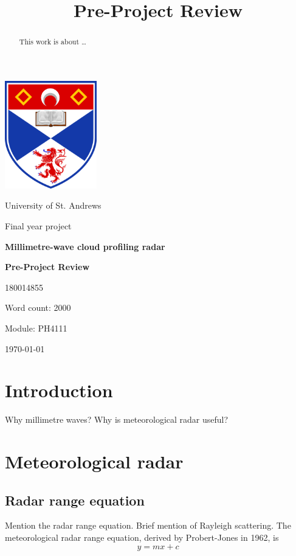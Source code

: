 \documentclass{article}
\title       {Pre-Project Review}
\begin{document}
\begin{titlepage}
	\centering
	{\includegraphics[width=0.3\textwidth]{uos-logo}}
	\par\vspace{1cm}
	{\LARGE University of St. Andrews\par}
	\vspace{1cm}
	{\Large Final year project\par}
	\vspace{1.5cm}
	{\huge\bfseries Millimetre-wave cloud profiling radar\par}
	{\huge\bfseries Pre-Project Review\par}
	\vspace{2cm}
	{\Large 180014855\par}
	{\small Word count: 2000\par}
	{\small Module: PH4111}
	\vfill

	{\large \today\par}
\end{titlepage}

\begin{abstract}
This work is about \dots
\end{abstract}


\section{Introduction} \label{sec:Introduction}
Why millimetre waves?
Why is meteorological radar useful?

\section{Meteorological radar}
\subsection{Radar range equation}
Mention the radar range equation.
Brief mention of Rayleigh scattering.
The meteorological radar range equation, derived by Probert-Jones in 1962, is\supercite{ProbertJones}
\begin{equation}
	y = m x + c\label{eqn:MeteoRange}
\end{equation}
\end{document}
